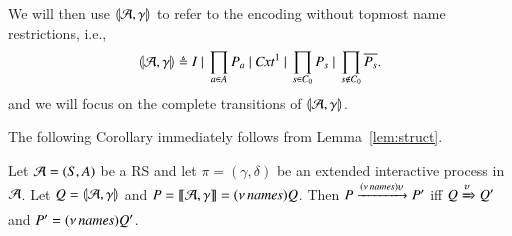 We will then use $\llparenthesis{\cal A},\gamma\rrparenthesis$ to refer to the encoding without topmost name restrictions, i.e.,
$$
\llparenthesis{\cal A},\gamma\rrparenthesis \triangleq 
I~|~ \prod_{a\in A} P_a ~|~  \mathit{Cxt}^1~|~\prod_{s\in C_0}P_{s} ~|~ \prod_{s \notin C_0}\overline{P_s} .
$$
and we will focus on the complete transitions of $\llparenthesis{\cal A},\gamma\rrparenthesis$.

The following Corollary immediately follows from Lemma~\ref{lem:struct}.

\begin{corollary}
Let ${\cal A} = (S, A)$ be a RS and let $\pi=(\gamma,\delta)$ be an extended  interactive process in ${\cal A}$. 
Let $Q=\llparenthesis{\cal A},\gamma\rrparenthesis$ and $P= \llbracket{\cal A},\gamma\rrbracket = (\nu\, \mathit{names})Q$. 
Then $P \xrightarrow{(\nu\, \mathit{names})\upsilon} P'$ iff $Q \xRightarrow{\upsilon} Q'$ and $P'=(\nu\, \mathit{names})Q'$.
\end{corollary}


